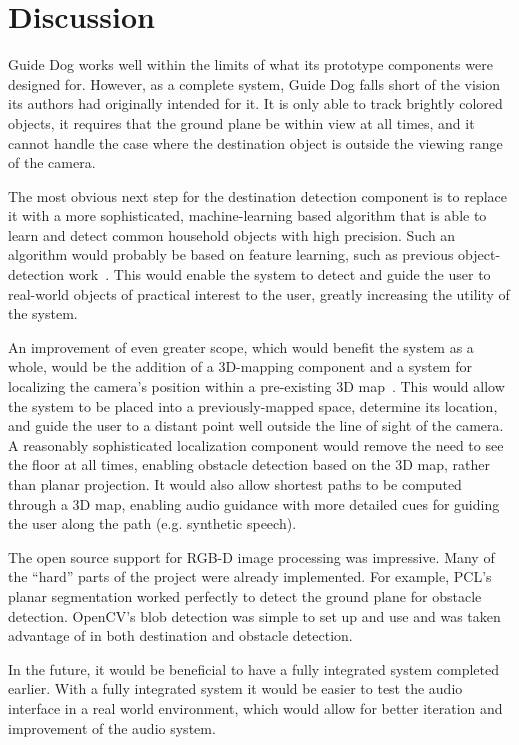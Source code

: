 \section{Discussion}
\label{sec:discussion}

Guide Dog works well within the limits of what its prototype components were
designed for. However, as a complete system, Guide Dog falls short of the 
vision its authors had originally intended for it. It is only able to track
brightly colored objects, it requires that the ground plane be within view
at all times, and it cannot handle the case where the destination object is 
outside the viewing range of the camera. 

The most obvious next step for the destination detection component is to
replace it with a more sophisticated, machine-learning based algorithm that
is able to learn and detect common household objects with high precision.
Such an algorithm would probably be based on feature learning, such as
previous object-detection work~\cite{lai_icra12}.
This would enable the system to detect and guide the user to real-world
objects of practical interest to the user, greatly increasing the
utility of the system.

An improvement of even greater scope, which would benefit the system as
a whole, would be the addition of a 3D-mapping component and a system
for localizing the camera's position within a pre-existing 3D map~\cite{Du:2011:IMI:2030112.2030123}. This
would allow the system to be placed into a previously-mapped space,
determine its location, and guide the user to a distant point well
outside the line of sight of the camera. A reasonably sophisticated 
localization component would remove the need to see the floor at all
times, enabling obstacle detection based on the 3D map, rather than 
planar projection. It would also allow shortest paths to be computed
through a 3D map, enabling audio guidance with more detailed cues for 
guiding the user along the path (e.g. synthetic speech).

The open source support for RGB-D image processing was impressive. Many of the
``hard'' parts of the project were already implemented. For example, PCL's
planar segmentation worked perfectly to detect the ground plane for obstacle
detection. OpenCV's blob detection was simple to set up and use and was taken
advantage of in both destination and obstacle detection.

In the future, it would be beneficial to have a fully integrated system
completed earlier. With a fully integrated system it would be easier to test the
audio interface in a real world environment, which would allow for better
iteration and improvement of the audio system.
